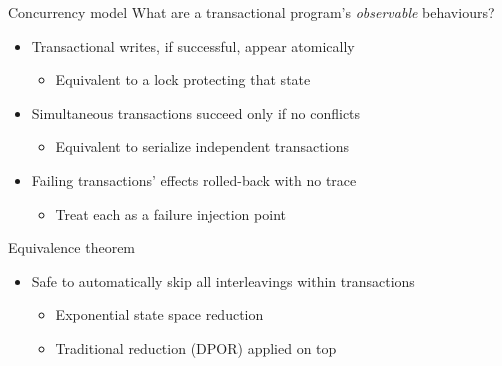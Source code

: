 \documentclass[xcolor=dvipsnames]{beamer}
\begin{document}
\begin{frame}{Concurrency model}
	What are a transactional program's {\em observable} behaviours?
	\begin{itemize}
		\item Transactional writes, if successful, appear atomically %
		\begin{itemize}
			\item Equivalent to a lock protecting that state
		\end{itemize}
			\pause
		\item Simultaneous transactions succeed only if no conflicts
		\begin{itemize}
			\item Equivalent
				to serialize independent transactions
		\end{itemize}
			\pause
		\item Failing transactions' effects rolled-back with no trace
		\begin{itemize}
			\item Treat each \xbegin as a failure injection point
		\end{itemize}
	\end{itemize}
	\pause
	\linegap

	Equivalence theorem
	\begin{itemize}
		\item Safe to automatically skip all interleavings within transactions %
			\begin{itemize}
				\item Exponential state space reduction
				\item Traditional reduction (DPOR) applied on top
			\end{itemize}
	\end{itemize}
\end{frame}
\end{document}
